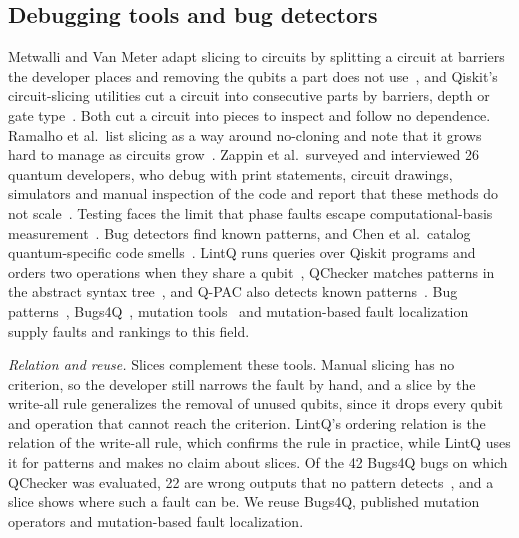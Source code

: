 \subsection{Debugging tools and bug detectors}
Metwalli and Van Meter adapt slicing to circuits by splitting a circuit at barriers the developer places and removing
the qubits a part does not use~\cite{metwalli2022debugging, metwalli2024testing}, and Qiskit's circuit-slicing
utilities cut a circuit into consecutive parts by barriers, depth or gate type~\cite{qiskitaddonutils}. Both cut a
circuit into pieces to inspect and follow no dependence. Ramalho et al.\ list slicing as a way around no-cloning and
note that it grows hard to manage as circuits grow~\cite{ramalho2025road}. Zappin et al.\ surveyed and interviewed 26
quantum developers, who debug with print statements, circuit drawings, simulators and manual inspection of the code
and report that these methods do not scale~\cite{zappin2026challenges}. Testing faces the limit that phase faults
escape computational-basis measurement~\cite{oldfield2024faster}. Bug detectors find known patterns, and Chen et al.\
catalog quantum-specific code smells~\cite{chen2023smelly}. LintQ runs queries over Qiskit programs and orders two
operations when they share a qubit~\cite{paltenghi2024lintq}, QChecker matches patterns in the abstract syntax
tree~\cite{zhao2023qchecker}, and Q-PAC also detects known patterns~\cite{nayak2023qpac}. Bug
patterns~\cite{zhao2021bugpatterns}, Bugs4Q~\cite{zhao2023bugs4q}, mutation tools~\cite{mendiluze2021muskit,
fortunato2022qmutpy, garcia2022testing} and mutation-based fault localization~\cite{ishimoto2025mbfl} supply faults
and rankings to this field.

\emph{Relation and reuse.} Slices complement these tools. Manual slicing has no criterion, so the developer still
narrows the fault by hand, and a slice by the write-all rule generalizes the removal of unused qubits, since it drops
every qubit and operation that cannot reach the criterion. LintQ's ordering relation is the relation of the write-all
rule, which confirms the rule in practice, while LintQ uses it for patterns and makes no claim about slices. Of the
42 Bugs4Q bugs on which QChecker was evaluated, 22 are wrong outputs that no pattern detects~\cite{zhao2023qchecker},
and a slice shows where such a fault can be. We reuse Bugs4Q, published mutation operators and mutation-based fault
localization.

